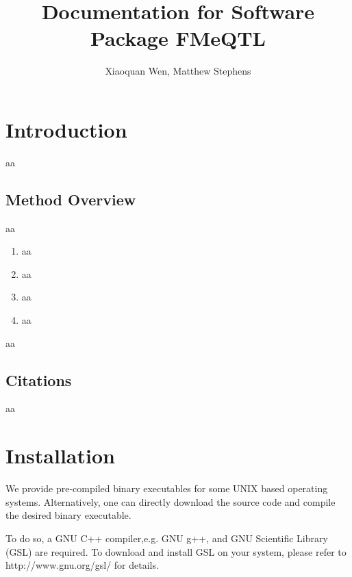 \documentclass[11pt,fleqn]{article}
\author{Xiaoquan Wen, Matthew Stephens}
\title{Documentation for Software Package FMeQTL}
\begin{document}
\maketitle

\section{Introduction}

 aa

\subsection{Method Overview}

 aa

\begin{enumerate}
\item aa

\item aa



\item aa
  
\item aa

\end{enumerate}

aa

\subsection{Citations}

aa

\newpage

\section{Installation}

We provide pre-compiled binary executables for some UNIX based operating systems. Alternatively, one can directly download the source code and compile the desired binary executable. 

To do so, a GNU C++ compiler,e.g. GNU g++, and GNU Scientific Library (GSL) are required. To download and install GSL on your system, please refer to http://www.gnu.org/gsl/ for details.


\newpage  
\end{document}
